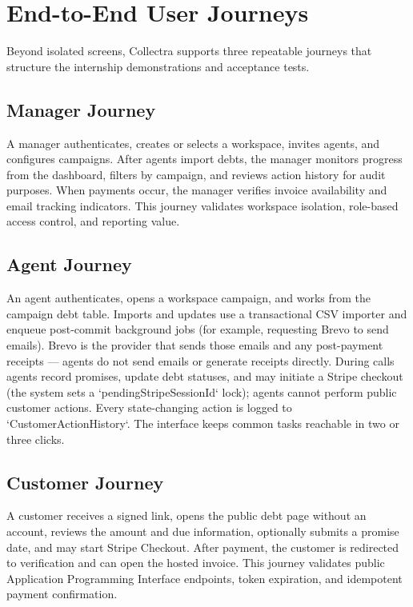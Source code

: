 \documentclass[12pt,a4paper]{report}
\begin{document}
\section{End-to-End User Journeys}
\label{sec:user-journeys}

Beyond isolated screens, Collectra supports three repeatable journeys that structure the
internship demonstrations and acceptance tests.

\subsection{Manager Journey}

A manager authenticates, creates or selects a workspace, invites agents, and configures campaigns.
After agents import debts, the manager monitors progress from the dashboard, filters by campaign,
and reviews action history for audit purposes.
When payments occur, the manager verifies invoice availability and email tracking indicators.
This journey validates workspace isolation, role-based access control, and reporting value.

\subsection{Agent Journey}

An agent authenticates, opens a workspace campaign, and works from the campaign debt table. Imports and updates use a transactional CSV importer and enqueue post-commit background jobs (for example, requesting Brevo to send emails). Brevo is the provider that sends those emails and any post-payment receipts — agents do not send emails or generate receipts directly. During calls agents record promises, update debt statuses, and may initiate a Stripe checkout (the system sets a `pendingStripeSessionId` lock); agents cannot perform public customer actions. Every state-changing action is logged to `CustomerActionHistory`. The interface keeps common tasks reachable in two or three clicks.

\subsection{Customer Journey}

A customer receives a signed link, opens the public debt page without an account, reviews the
amount and due information, optionally submits a promise date, and may start Stripe Checkout.
After payment, the customer is redirected to verification and can open the hosted invoice.
This journey validates public Application Programming Interface endpoints, token expiration, and
idempotent payment confirmation.
\end{document}
